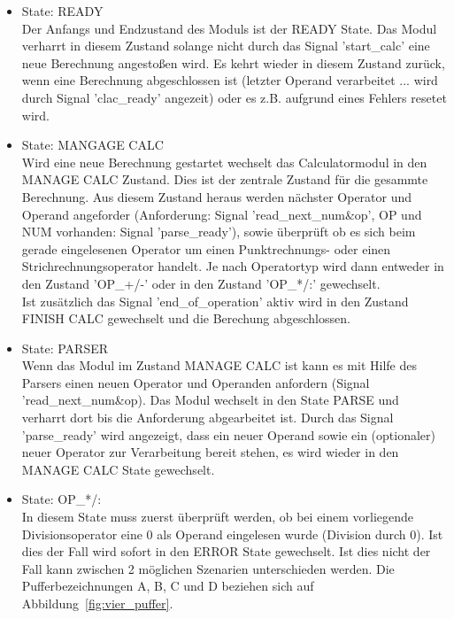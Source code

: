\begin{itemize}

\item State: READY \\
Der Anfangs und Endzustand des Moduls ist der READY State. Das Modul verharrt in diesem Zustand solange nicht durch das Signal 'start\_calc' eine neue Berechnung angestoßen wird. Es kehrt wieder in diesem Zustand zurück, wenn eine Berechnung abgeschlossen ist (letzter Operand verarbeitet ... wird durch Signal 'clac\_ready' angezeit) oder es z.B. aufgrund eines Fehlers resetet wird.

\item State: MANGAGE CALC \\
Wird eine neue Berechnung gestartet wechselt das Calculatormodul in den MANAGE CALC Zustand. Dies ist der zentrale Zustand für die gesammte Berechnung. Aus diesem Zustand heraus werden nächster Operator und Operand angeforder (Anforderung: Signal 'read\_next\_num\&op', OP und NUM vorhanden: Signal 'parse\_ready'), sowie überprüft ob es sich beim gerade eingelesenen Operator um einen Punktrechnungs- oder einen Strichrechnungsoperator handelt. Je nach Operatortyp wird dann entweder in den Zustand 'OP\_+/-' oder in den Zustand 'OP\_*/:' gewechselt. \\
Ist zusätzlich das Signal 'end\_of\_operation' aktiv wird in den Zustand FINISH CALC gewechselt und die Berechung abgeschlossen.


\item State: PARSER \\
Wenn das Modul im Zustand MANAGE CALC ist kann es mit Hilfe des Parsers einen neuen Operator und Operanden anfordern (Signal 'read\_next\_num\&op). Das Modul wechselt in den State PARSE und verharrt dort bis die Anforderung abgearbeitet ist. Durch das Signal 'parse\_ready' wird angezeigt, dass ein neuer Operand sowie ein (optionaler) neuer Operator zur Verarbeitung bereit stehen, es wird wieder in den MANAGE CALC State gewechselt. 

\item State: OP\_*/: \\
In diesem State muss zuerst überprüft werden, ob bei einem vorliegende Divisionsoperator eine 0 als Operand eingelesen wurde (Division durch 0). Ist dies der Fall wird sofort in den ERROR State gewechselt. Ist dies nicht der Fall kann zwischen 2 möglichen Szenarien unterschieden werden.
Die Pufferbezeichnungen A, B, C und D beziehen sich auf Abbildung~\ref{fig:vier_puffer}.


\end{itemize}

